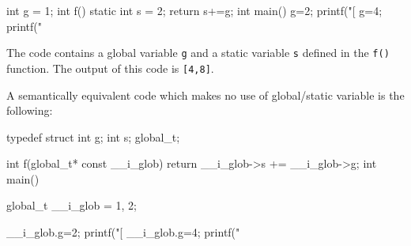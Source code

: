 \begin{srcCode}
int g = 1;
int f() {
	static int s = 2;
	return s+=g;
}
int main() {
	g=2; printf("[%
	g=4; printf("%
}
\end{srcCode}

The code contains a global variable {\tt g} and a static variable {\tt s}
defined in the {\tt f()} function. The output of this code is {\tt [4,8]}. 

A semantically equivalent code which makes no use of global/static variable is the
following:

\begin{srcCode}
typedef struct { int g; int s; } global_t;

int f(global_t* const __i_glob) {
	return __i_glob->s += __i_glob->g;
}
int main() {
	global_t __i_glob = {1, 2};

	__i_glob.g=2; printf("[%
	__i_glob.g=4; printf("%
}
\end{srcCode}

